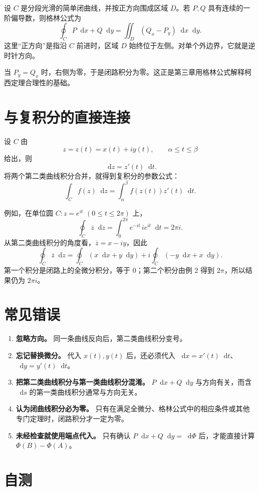 \documentclass[UTF8,11pt]{ctexart}
\newcommand{\dif}{\mathop{}\!\mathrm{d}}
\begin{document}
设 $C$ 是分段光滑的简单闭曲线，并按正方向围成区域 $D$。若 $P,Q$ 具有连续的一阶偏导数，则格林公式为
\[
\boxed{
\oint_C P\dif x+Q\dif y
=\iint_D(Q_x-P_y)\dif x\dif y.
}
\]
这里“正方向”是指沿 $C$ 前进时，区域 $D$ 始终位于左侧。对单个外边界，它就是逆时针方向。

当 $P_y=Q_x$ 时，右侧为零，于是闭路积分为零。这正是第三章用格林公式解释柯西定理合理性的基础。

\section{与复积分的直接连接}

设 $C$ 由
\[
z=z(t)=x(t)+iy(t),
\qquad \alpha\leq t\leq\beta
\]
给出，则
\[
\dif z=z'(t)\dif t.
\]
将两个第二类曲线积分合并，就得到复积分的参数公式：
\[
\boxed{
\int_C f(z)\dif z
=\int_\alpha^\beta f(z(t))z'(t)\dif t.
}
\]

例如，在单位圆 $C: z=e^{it}$ $(0\leq t\leq2\pi)$ 上，
\[
\oint_C\overline z\dif z
=\int_0^{2\pi}e^{-it}\,ie^{it}\dif t
=2\pi i.
\]
从第二类曲线积分的角度看，$\overline z=x-iy$，因此
\[
\oint_C\overline z\dif z
=\oint_C(x\dif x+y\dif y)
+i\oint_C(-y\dif x+x\dif y).
\]
第一个积分是闭路上的全微分积分，等于 $0$；第二个积分由例 2 得到 $2\pi$，所以结果仍为 $2\pi i$。

\section{常见错误}

\begin{enumerate}
  \item \textbf{忽略方向。} 同一条曲线反向后，第二类曲线积分变号。
  \item \textbf{忘记替换微分。} 代入 $x(t),y(t)$ 后，还必须代入 $\dif x=x'(t)\dif t$、$\dif y=y'(t)\dif t$。
  \item \textbf{把第二类曲线积分与第一类曲线积分混淆。} $P\dif x+Q\dif y$ 与方向有关，而含 $\dif s$ 的第一类曲线积分通常与方向无关。
  \item \textbf{认为闭曲线积分必为零。} 只有在满足全微分、格林公式中的相应条件或其他专门定理时，闭路积分才一定为零。
  \item \textbf{未经检查就使用端点代入。} 只有确认 $P\dif x+Q\dif y=\dif\Phi$ 后，才能直接计算 $\Phi(B)-\Phi(A)$。
\end{enumerate}

\section{自测}
\end{document}
